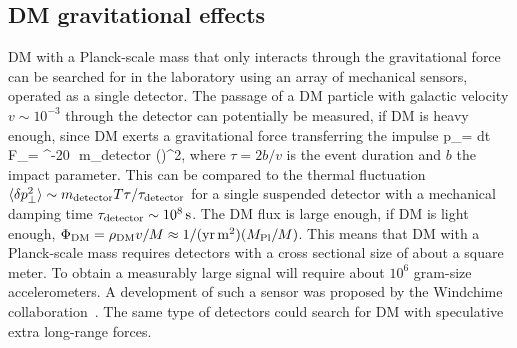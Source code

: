 \subsection{DM gravitational effects} 
\label{gravisignal}
DM with a Planck-scale mass that only interacts through the gravitational force can be searched for in the laboratory using an array of mechanical sensors, operated as a single detector. 
The passage of a DM particle with galactic velocity $v \sim 10^{-3}$
through the detector can potentially be measured, if DM is heavy enough, since DM exerts a gravitational force
transferring the impulse
\beq  
p_\perp= \int dt\, F_\perp = \tau {} ^{-20}\,\, m_{\rm detector} \left(\right)^2,
\eeq
where $\tau = 2b/v $ is the event duration and $b$ the impact parameter.
This can be compared to the thermal fluctuation $\langle  \delta p_\perp^2\rangle \sim m_{\rm detector} T \tau/\tau_{\rm detector}$
for a single suspended detector  with a mechanical damping time $\tau_{\rm detector} \sim 10^8\,{\rm s}$.
The DM flux is large enough, if DM is light enough,
$\Phi_{\rm DM}= \rho_{\rm DM} v/M\approx 1/({\rm yr}\, {\rm  m}^2)  (M_{\rm Pl}/M)$. This means that
DM with a Planck-scale mass requires detectors with a cross sectional size of about a square meter.
To obtain a measurably large signal will require about $10^6$ gram-size accelerometers. 
A development of such a sensor was proposed by the {\sc Windchime} collaboration~\cite{gravitational:DM:direct}.  
The same type of detectors could search for DM with speculative extra long-range forces.

